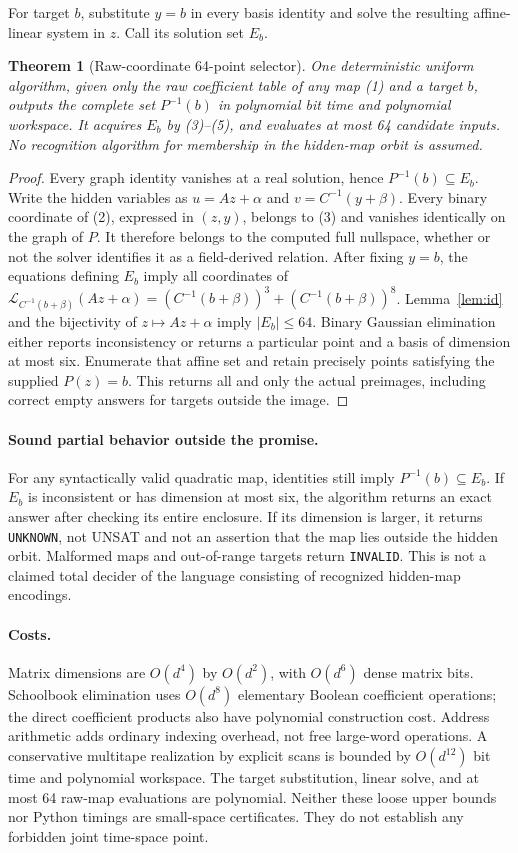 \documentclass[11pt]{article}
\newtheorem{theorem}{Theorem}
\begin{document}
For target $b$, substitute $y=b$ in every basis identity and solve the resulting
affine-linear system in $z$. Call its solution set $E_b$.
\begin{theorem}[Raw-coordinate 64-point selector]\label{thm:main}
One deterministic uniform algorithm, given only the raw coefficient table of
any map (1) and a target $b$, outputs the complete set $P^{-1}(b)$ in polynomial
bit time and polynomial workspace. It acquires $E_b$ by (3)--(5), and evaluates
at most 64 candidate inputs. No recognition algorithm for membership in the
hidden-map orbit is assumed.
\end{theorem}
\begin{proof}
Every graph identity vanishes at a real solution, hence $P^{-1}(b)\subseteq E_b$.
Write the hidden variables as $u=Az+\alpha$ and
$v=C^{-1}(y+\beta)$. Every binary coordinate of (2), expressed in $(z,y)$,
belongs to (3) and vanishes identically on the graph of $P$. It therefore
belongs to the computed full nullspace, whether or not the solver identifies
it as a field-derived relation. After fixing $y=b$, the equations defining
$E_b$ imply all coordinates of
$\mathcal L_{C^{-1}(b+\beta)}(Az+\alpha)=
(C^{-1}(b+\beta))^3+(C^{-1}(b+\beta))^8$.
Lemma~\ref{lem:id} and the bijectivity of $z\mapsto Az+\alpha$ imply
$|E_b|\le64$. Binary Gaussian elimination either reports inconsistency or
returns a particular point and a basis of dimension at most six. Enumerate
that affine set and retain precisely points satisfying the supplied $P(z)=b$.
This returns all and only the actual preimages, including correct empty
answers for targets outside the image.
\end{proof}

\paragraph{Sound partial behavior outside the promise.}
For any syntactically valid quadratic map, identities still imply
$P^{-1}(b)\subseteq E_b$. If $E_b$ is inconsistent or has dimension at most six,
the algorithm returns an exact answer after checking its entire enclosure.
If its dimension is larger, it returns \texttt{UNKNOWN}, not UNSAT and not an
assertion that the map lies outside the hidden orbit. Malformed maps and
out-of-range targets return \texttt{INVALID}. This is not a claimed total
decider of the language consisting of recognized hidden-map encodings.

\paragraph{Costs.}
Matrix dimensions are $O(d^4)$ by $O(d^2)$, with $O(d^6)$ dense matrix bits.
Schoolbook elimination uses $O(d^8)$ elementary Boolean coefficient operations;
the direct coefficient products also have polynomial construction cost.
Address arithmetic adds ordinary indexing overhead, not free large-word
operations. A conservative multitape realization by explicit scans is bounded
by $O(d^{12})$ bit time and polynomial workspace. The target substitution,
linear solve, and at most 64 raw-map evaluations are polynomial. Neither these
loose upper bounds nor Python timings are small-space certificates. They do
not establish any forbidden joint time-space point.
\end{document}
